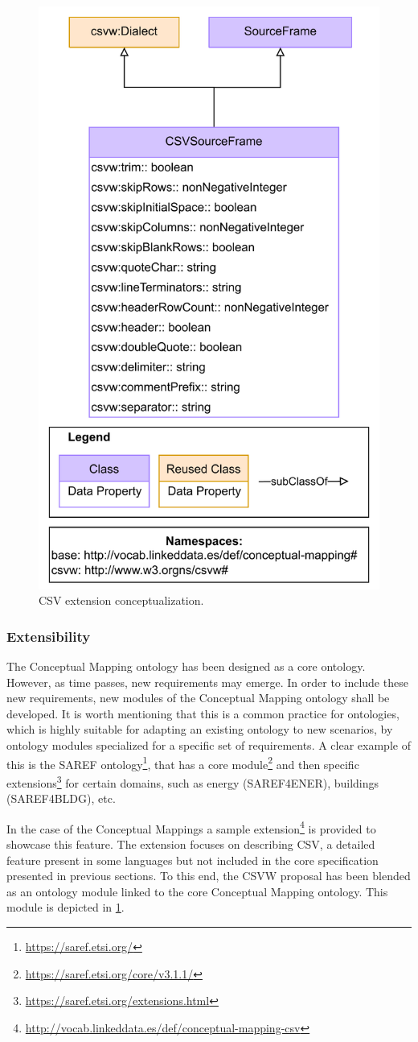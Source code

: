 \begin{figure}[!t]
\centering
\includegraphics[width=0.5\linewidth]{figures/CSV-extension.pdf}
\caption{CSV extension conceptualization.}
\label{fig:csv-ext}
\end{figure}


\subsubsection{Extensibility}

The Conceptual Mapping ontology has been designed as a core ontology. However, as time passes, new requirements may emerge. In order to include these new requirements, new modules of the Conceptual Mapping ontology shall be developed. It is worth mentioning that this is a common practice for ontologies, which is highly suitable for adapting an existing ontology to new scenarios, by ontology modules specialized for a specific set of requirements. A clear example of this is the SAREF ontology\footnote{\url{https://saref.etsi.org/}}, that has a core module\footnote{\url{https://saref.etsi.org/core/v3.1.1/}} and then specific extensions\footnote{\url{https://saref.etsi.org/extensions.html}} for certain domains, such as energy (SAREF4ENER), buildings (SAREF4BLDG), etc.

In the case of the Conceptual Mappings a sample extension\footnote{\url{http://vocab.linkeddata.es/def/conceptual-mapping-csv}} is provided to showcase this feature. The extension focuses on describing CSV, a detailed feature present in some languages but not included in the core specification presented in previous sections. To this end, the CSVW proposal has been blended as an ontology module linked to the core Conceptual Mapping ontology. This module is depicted in \cref{fig:csv-ext}.



